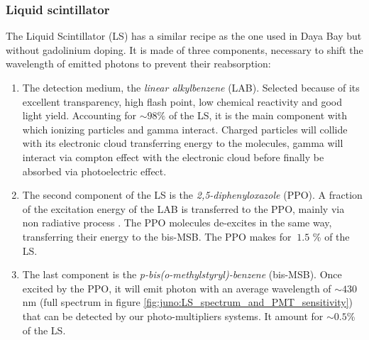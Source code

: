\subsubsection{Liquid scintillator}
\label{sec:juno:LS}

The Liquid Scintillator (LS) has a similar recipe as the one used in Daya Bay \cite{bay_optimization_2020} but without gadolinium doping. It is made of three components, necessary to shift the wavelength of emitted photons to prevent their reabsorption:
\begin{enumerate}
  \item The detection medium, the \textit{linear alkylbenzene} (LAB). Selected because of its excellent transparency, high flash point, low chemical reactivity and good light yield. Accounting for $\sim 98\%$ of the LS, it is the main component with which ionizing particles and gamma interact. Charged particles will collide with its electronic cloud transferring energy to the molecules, gamma will interact via compton effect with the electronic cloud before finally be absorbed via photoelectric effect.
  \item The second component of the LS is the \textit{2,5-diphenyloxazole} (PPO). A fraction of the excitation energy of the LAB is transferred to the PPO, mainly via non radiative process \cite{birks_chapter_1964}. The PPO molecules de-excites in the same way, transferring their energy to the bis-MSB. The PPO makes for $~1.5$ \% of the LS.
  \item The last component is the \textit{p-bis(o-methylstyryl)-benzene} (bis-MSB). Once excited by the PPO, it will emit photon with an average wavelength of $\sim430$ nm (full spectrum in figure \ref{fig:juno:LS_spectrum_and_PMT_sensitivity}) that can be detected by our photo-multipliers systems. It amount for $\sim 0.5$\% of the LS.
\end{enumerate}

